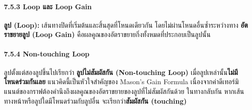 \paragraph{7.5.3 Loop และ Loop Gain}

\textbf{ลูป (Loop):} เส้นทางปิดที่เริ่มต้นและสิ้นสุดที่โหนดเดียวกัน โดยไม่ผ่านโหนดอื่นซ้ำระหว่างทาง \textbf{อัตราขยายลูป (Loop Gain)} คือผลคูณของอัตราขยายกิ่งทั้งหมดที่ประกอบเป็นลูปนั้น

\paragraph{7.5.4 Non-touching Loop}

ลูปตั้งแต่สองลูปขึ้นไปเรียกว่า \textbf{ลูปไม่สัมผัสกัน (Non-touching Loop)} เมื่อลูปเหล่านั้น\textbf{ไม่มีโหนดร่วมกันเลย} แนวคิดนี้เป็นหัวใจสำคัญของ Mason's Gain Formula เนื่องจากค่าดีเทอร์มิแนนต์ของกราฟต้องคำนึงถึงผลคูณของอัตราขยายของลูปที่ไม่สัมผัสกันด้วย ในทางกลับกัน หากเส้นทางหน้าหรือลูปใดมีโหนดร่วมกับลูปอื่น จะเรียกว่า\textbf{สัมผัสกัน (touching)}


